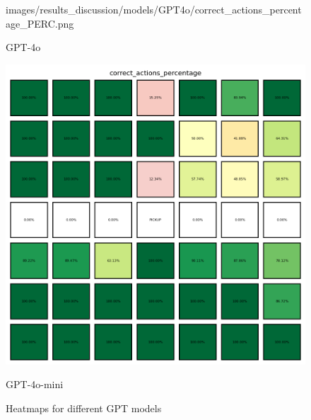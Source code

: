 \begin{figure}[h]
\begin{minipage}[b]{0.32\textwidth}
{      images/results_discussion/models/GPT4o/correct_actions_percentage_PERC.png
    }
    \caption{GPT-4o}
    \label{fig:models_gpt4o}
  \end{minipage}
  \hfill
  \begin{minipage}[b]{0.32\textwidth}
    \centering
    \includegraphics[width=\textwidth]{
      images/results_discussion/models/GPT4o-mini/correct_actions_percentage_PERC.png
    }
    \caption{GPT-4o-mini}
    \label{fig:models_gpt4o_mini}
  \end{minipage}
  \caption{Heatmaps for different GPT models}
  \label{fig:models_chm}
\end{figure}